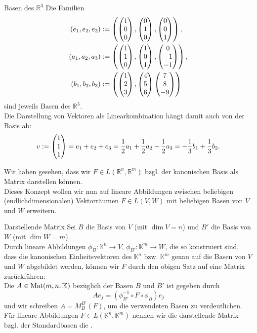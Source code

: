 \begin{Beispiel}{Basen des $\mathbb{R}^3$}
Die Familien
\begin{align*}(e_1,e_2,e_3)&:=\left({\begin{pmatrix}1\\0\\0\end{pmatrix},\begin{pmatrix}0\\1\\0\end{pmatrix},\begin{pmatrix}0\\0\\1\end{pmatrix}}\right),\\
(a_1,a_2,a_3)&:=\left({\begin{pmatrix}1\\1\\0\end{pmatrix},\begin{pmatrix}1\\0\\1\end{pmatrix},\begin{pmatrix}0\\-1\\-1\end{pmatrix}}\right),\\
(b_1,b_2,b_3)&:=\left({\begin{pmatrix}1\\2\\3\end{pmatrix},\begin{pmatrix}4\\5\\6\end{pmatrix}\begin{pmatrix}7\\8\\-9\end{pmatrix}}\right)
\end{align*}
sind jeweils Basen des $\mathbb{R}^3$.\\
Die Darstellung von Vektoren als Linearkombination hängt damit auch von der Basis ab:
\begin{equation*}
    v:=\begin{pmatrix}1\\1\\1\end{pmatrix}=e_1+e_2+e_3=\frac{1}{2}a_1+\frac{1}{2}a_2-\frac{1}{2}a_3=-\frac{1}{3}b_1+\frac{1}{3}b_2.
\end{equation*}
\end{Beispiel}
Wir haben gesehen, dass wir $F\in L(\mathbb{R}^n,\mathbb{R}^m)$ bzgl. der kanonischen Basis als Matrix darstellen können.\\
Dieses Konzept wollen wir nun auf lineare Abbildungen zwischen beliebigen (endlichdimensionalen) Vektorräumen $F\in L(V,W)$ mit beliebigen Basen von $V$ und $W$ erweitern.
\begin{Def}
{Darstellende Matrix}
Sei $B$ die Basis von $V$ (mit $\dim V=n$) und $B'$ die Basis von $W$ (mit $\dim W=m$).\\
Durch lineare Abbildungen $\phi_B:\mathbb{K}^n\to V,\,\phi_{B'}:\mathbb{K}^m\to W$, die so konstruiert sind, dass die kanonischen Einheitsvektoren des $\mathbb{K}^n$ bzw. $\mathbb{K}^m$ genau auf die Basen von $V$ und $W$ abgebildet werden, können wir $F$ durch den obigen Satz auf eine Matrix zurückführen:\\
Die  $A\in\text{Mat}(m,n,\mathbb{K})$ bezüglich der Basen $B$ und $B'$ ist gegeben durch
\begin{equation*}
    Ae_j=(\phi^{-1}_{B'}\circ F\circ \phi_B)e_j
\end{equation*}
und wir schreiben $A=M_B^{B'}(F)$, um die verwendeten Basen zu verdeutlichen.\\
Für lineare Abbildungen $F\in L(\mathbb{K}^n,\mathbb{K}^m)$ nennen wir die darstellende Matrix bzgl. der Standardbasen die .
\end{Def}
